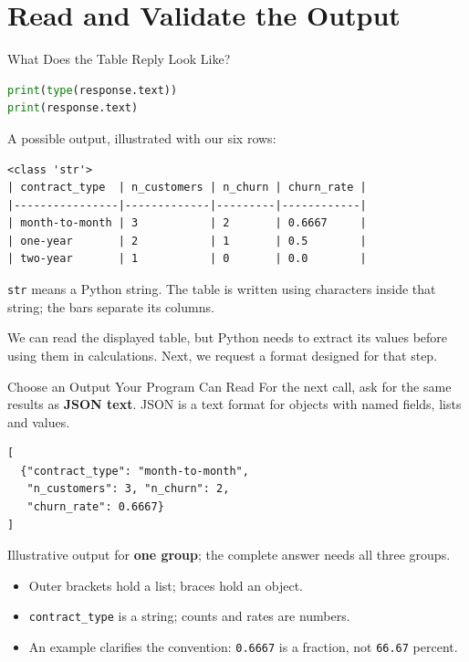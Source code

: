 \documentclass[aspectratio=169]{beamer}
\begin{document}
\section{Read and Validate the Output}

\begin{frame}[fragile]{What Does the Table Reply Look Like?}
\begin{lstlisting}[language=Python]
print(type(response.text))
print(response.text)
\end{lstlisting}
  \small A possible output, illustrated with our six rows:
\begin{lstlisting}[language={},columns=fixed]
<class 'str'>
| contract_type  | n_customers | n_churn | churn_rate |
|----------------|-------------|---------|------------|
| month-to-month | 3           | 2       | 0.6667     |
| one-year       | 2           | 1       | 0.5        |
| two-year       | 1           | 0       | 0.0        |
\end{lstlisting}
  \small \texttt{str} means a Python string. The table is written using characters inside that string; the bars separate its columns.
  \par\vspace{0.5em}
  We can read the displayed table, but Python needs to extract its values before using them in calculations. Next, we request a format designed for that step.
\end{frame}

\begin{frame}[fragile]{Choose an Output Your Program Can Read}
  \small For the next call, ask for the same results as \textbf{JSON text}. JSON is a text format for objects with named fields, lists and values.
\begin{lstlisting}[language={}]
[
  {"contract_type": "month-to-month",
   "n_customers": 3, "n_churn": 2,
   "churn_rate": 0.6667}
]
\end{lstlisting}
  \small Illustrative output for \textbf{one group}; the complete answer needs all three groups.
  \begin{itemize}
    \item Outer brackets hold a list; braces hold an object.
    \item \texttt{contract\_type} is a string; counts and rates are numbers.
    \item An example clarifies the convention: \texttt{0.6667} is a fraction, not \texttt{66.67} percent.
  \end{itemize}
\end{frame}
\end{document}
